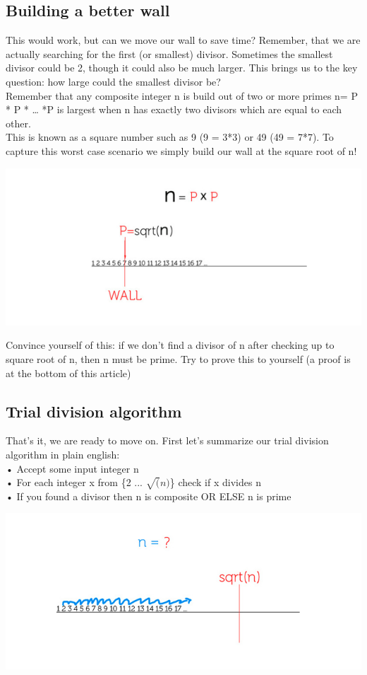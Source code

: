 \documentclass{report}
\begin{document}
\subsection{Building a better wall}
This would work, but can we move our wall to save time? Remember, that we are actually searching for the first (or smallest) divisor. Sometimes the smallest divisor could be 2, though it could also be much larger. This brings us to the key question: how large could the smallest divisor be?\\
Remember that any composite integer n is build out of two or more primes n= P * P * …
 *P is largest when n has exactly two divisors which are equal to each other.\\ This is known as a square number such as 9 (9 = 3*3) or 49 (49 = 7*7). To capture this worst case scenario we simply build our wall at the square root of n!
\begin{center}
	\includegraphics[scale=1]{44.png}
\end{center}
Convince yourself of this: if we don't find a divisor of n after checking up to square root of n, then n must be prime. Try to prove this to yourself (a proof is at the bottom of this article)
\subsection{Trial division algorithm}
That's it, we are ready to move on. First let's summarize our trial division algorithm in plain english:\\
•	Accept some input integer n\\
•	For each integer x from \{2 ... $\sqrt(n)$\} check if x divides n\\
•	If you found a divisor then n is composite OR ELSE n is prime\\
\begin{center}
	\includegraphics[scale=1]{45.png}
\end{center}
\end{document}
